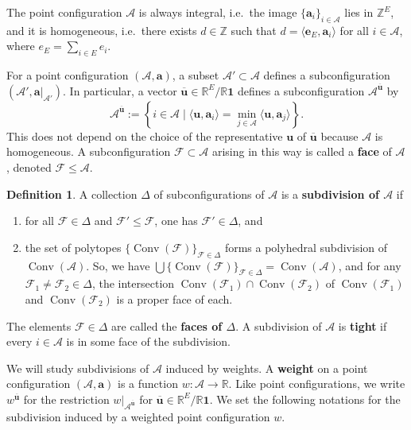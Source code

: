 \documentclass[11pt]{amsart}
\newcommand{\RR}{\mathbb R}
\newcommand{\ZZ}{\mathbb Z}
\newcommand{\be}{\mathbf e}
\newcommand{\bu}{{\mathbf u}}
\theoremstyle{definition}
\newtheorem{defn}[thm]{Definition}
\begin{document}
\proof[Assumption] The point configuration $\mathcal A$ is always integral, i.e.\ the image $\{\mathbf a_i\}_{i\in \mathcal A}$ lies in $\ZZ^E$, and it is homogeneous, i.e.\ there exists $d \in \ZZ$ such that $d = \langle \be_E, \mathbf a_i\rangle$ for all $i\in \mathcal A$, where $e_E = \sum_{i\in E} e_i$.

\smallskip
For a point configuration $(\mathcal A, \mathbf a)$, a subset $\mathcal A' \subset \mathcal A$ defines a subconfiguration $(\mathcal A', \mathbf a|_{\mathcal A'})$. In particular, a vector $\overline\bu \in \RR^E/\RR\mathbf 1$ defines a subconfiguration $\mathcal A^{\overline \bu}$ by 
\[
 \mathcal A^{\overline \bu}:= \left\{i\in \mathcal A \mid \langle \bu, \mathbf a_i \rangle = \min_{j\in \mathcal A}\langle \bu, \mathbf a_j\rangle \right\}.
\]
This does not depend on the choice of the representative $\bu$ of $\overline \bu$ because $\mathcal A$ is homogeneous.
A subconfiguration $\mathcal F \subset \mathcal A$ arising in this way 
is called a \textbf{face} of $\mathcal A$, denoted $\mathcal F \leq \mathcal A$.  

\begin{defn}
A collection $\Delta$ of subconfigurations of $\mathcal A$ is a \textbf{subdivision of $\mathcal A$} if
\begin{enumerate}
    \item for all $\mathcal F \in \Delta$ and $\mathcal F' \leq \mathcal F$, one has $\mathcal F'\in \Delta$, and
    \item the set of polytopes $\{\operatorname{Conv}(\mathcal F)\}_{\mathcal F \in \Delta}$ forms a polyhedral subdivision of $\operatorname{Conv}(\mathcal A)$.  So, we have $\bigcup \{\operatorname{Conv}(\mathcal F)\}_{\mathcal F \in \Delta} =\operatorname{Conv}(\mathcal A)$, and for any $\mathcal F_1 \neq \mathcal F_2 \in \Delta$, the intersection $\operatorname{Conv}({\mathcal F_1}) \cap \operatorname{Conv}({\mathcal F_2})$ of $\operatorname{Conv}({\mathcal F_1})$ and $\operatorname{Conv}({\mathcal F_2})$ is a proper face of each.
\end{enumerate}
The elements $\mathcal F\in \Delta$ are called the \textbf{faces of $\Delta$}.  A subdivision of $\mathcal A$ is \textbf{tight} if every $i\in \mathcal A$ is in some face of the subdivision.
\end{defn}

We will study subdivisions of $\mathcal A$ induced by weights.
A \textbf{weight} on a point configuration $(\mathcal A,\mathbf a)$ is a function $w: \mathcal A \to \RR$.  Like point configurations, we write $w^{\overline\bu}$ for the restriction $w|_{\mathcal A^{\overline\bu}}$ for $\overline\bu\in \RR^E/\RR\mathbf 1$.  We set the following notations for the subdivision induced by a weighted point configuration $w$.
\end{document}
